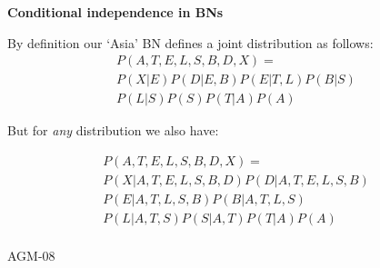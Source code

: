 \documentclass[landscape]{slides}
\newcommand{\lecnum}{AGM-08}
\newcommand{\slidehead}[1]{{\centering \bf #1 \\}}
\newenvironment{titledslide}[1]{\begin{slide}\slidehead{#1}\vfill}{\vfill \tiny \lecnum \end{slide}}
\begin{document}
\begin{titledslide}{Conditional independence in BNs}
  
  By definition our `Asia' BN defines a joint distribution as follows:
  \begin{multline*}
    P(A,T,E,L,S,B,D,X) = \\
    P(X|E)P(D|E,B) 
    P(E|T,L)P(B|S)\\
    P(L|S)P(S)P(T|A)P(A)
  \end{multline*}

But for \emph{any} distribution we also have:

\begin{multline*}
  P(A,T,E,L,S,B,D,X) = \\
  P(X|A,T,E,L,S,B,D)P(D|A,T,E,L,S,B) \\
  P(E|A,T,L,S,B)P(B|A,T,L,S)\\
    P(L|A,T,S)P(S|A,T)P(T|A)P(A)\\
  \end{multline*}

\end{titledslide}


\end{document}
